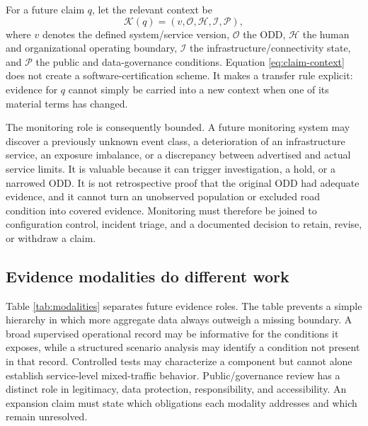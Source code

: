 \documentclass[conference]{../../../../Conference-LaTeX-template_10-17-19/IEEEtran}
\begin{document}
For a future claim $q$, let the relevant context be
\begin{equation}
\mathcal{K}(q)=\left(v,\mathcal{O},\mathcal{H},\mathcal{I},\mathcal{P}\right),
\label{eq:claim-context}
\end{equation}
where $v$ denotes the defined system/service version, $\mathcal{O}$ the ODD, $\mathcal{H}$ the human and organizational operating boundary, $\mathcal{I}$ the infrastructure/connectivity state, and $\mathcal{P}$ the public and data-governance conditions. Equation \eqref{eq:claim-context} does not create a software-certification scheme. It makes a transfer rule explicit: evidence for $q$ cannot simply be carried into a new context when one of its material terms has changed.

The monitoring role is consequently bounded. A future monitoring system may discover a previously unknown event class, a deterioration of an infrastructure service, an exposure imbalance, or a discrepancy between advertised and actual service limits. It is valuable because it can trigger investigation, a hold, or a narrowed ODD. It is not retrospective proof that the original ODD had adequate evidence, and it cannot turn an unobserved population or excluded road condition into covered evidence. Monitoring must therefore be joined to configuration control, incident triage, and a documented decision to retain, revise, or withdraw a claim.

\subsection{Evidence modalities do different work}
Table \ref{tab:modalities} separates future evidence roles. The table prevents a simple hierarchy in which more aggregate data always outweigh a missing boundary. A broad supervised operational record may be informative for the conditions it exposes, while a structured scenario analysis may identify a condition not present in that record. Controlled tests may characterize a component but cannot alone establish service-level mixed-traffic behavior. Public/governance review has a distinct role in legitimacy, data protection, responsibility, and accessibility. An expansion claim must state which obligations each modality addresses and which remain unresolved.
\end{document}
